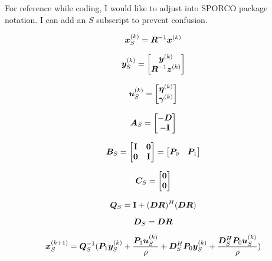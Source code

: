 \documentclass{article}
\begin{document}
For reference while coding, I would like to adjust into SPORCO package notation. I can add an $S$ subscript to prevent confusion.

\begin{equation}
\bm{x}_S^{(k)} = \bm{R}^{-1}\bm{x}^{(k)}
\end{equation}

\begin{equation}
\bm{y}_S^{(k)} = \begin{bmatrix} \bm{y}^{(k)} \\ \bm{R}^{-1}\bm{z}^{(k)} \end{bmatrix}
\end{equation}

\begin{equation}
\bm{u}_S^{(k)} = \begin{bmatrix} \bm{\eta}^{(k)} \\ \bm{\gamma}^{(k)} \end{bmatrix}
\end{equation}

\begin{equation}
\bm{A}_S = \begin{bmatrix} - \bm{D} \\ -{\bf I} \end{bmatrix}
\end{equation}

\begin{equation}
\bm{B}_S = \begin{bmatrix} {\bf I} & \bm{0} \\ \bm{0} & {\bf I} \end{bmatrix} = \begin{bmatrix} \bm{P}_0 & \bm{P}_1 \end{bmatrix}
\end{equation}

\begin{equation}
\bm{C}_S = \begin{bmatrix} \bm{0} \\ \bm{0} \end{bmatrix}
\end{equation}

\begin{equation}
\bm{Q}_S = {\bf I} + (\bm{D}\bm{R})^H(\bm{D}\bm{R})
\end{equation}

\begin{equation}
\bm{D}_S = \bm{D}\bm{R}
\end{equation}



\begin{equation}
\bm{x}_S^{(k + 1)} = \bm{Q}_S^{-1}(\bm{P}_1\bm{y}_S^{(k)} + \frac{\bm{P}_1\bm{u}_S^{(k)}}{\rho} + \bm{D}_S^H\bm{P}_0\bm{y}_S^{(k)} + \frac{\bm{D}_S^H\bm{P}_0\bm{u}_S^{(k)}}{\rho})
\end{equation}
\end{document}

